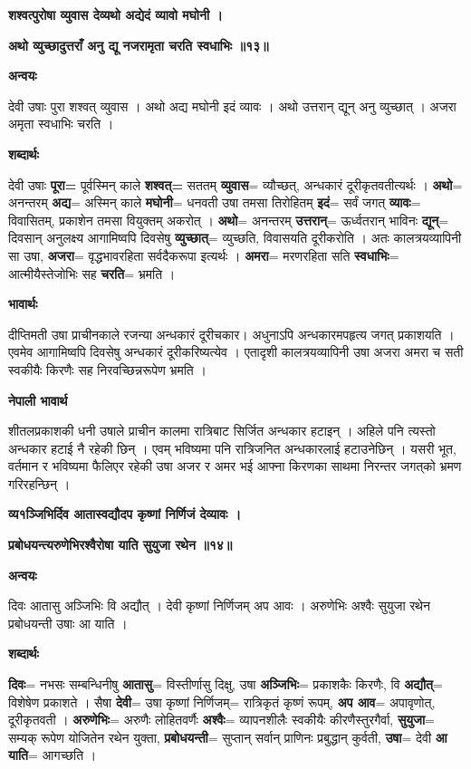 \documentclass[11pt, a5paper]{article}
\begin{document}
\textbf{शश्वत्पुरोषा व्युवास देव्यथो अद्येदं व्यावो मघोनी ।}

\textbf{अथो व्युच्छादुत्तराँ अनु द्यू नजरामृता चरति स्वधाभिः ॥१३॥}

\textbf{अन्वयः}

देवी उषाः पुरा शश्वत् व्युवास । अथो अद्य मघोनी इदं व्यावः । अथो उत्तरान् द्यून् अनु व्युच्छात् । अजरा अमृता स्वधाभिः चरति ।

\textbf{शब्दार्थः}

देवी उषाः \textbf{पूरा=} पूर्वस्मिन् काले \textbf{शश्वत्=} सततम् \textbf{व्युवास}= व्यौच्छत्, अन्धकारं दूरीकृतवतीत्यर्थः । \textbf{अथो}= अनन्तरम् \textbf{अद्य}= अस्मिन् काले \textbf{मघोनी}= धनवती उषा तमसा तिरोहितम् \textbf{इदं}= सर्वं जगत् \textbf{व्यावः}= विवासितम्, प्रकाशेन तमसा वियुक्तम् अकरोत् । \textbf{अथो}= अनन्तरम् \textbf{उत्तरान्}= ऊर्ध्वतरान् भाविनः \textbf{द्यून्}= दिवसान् अनुलक्ष्य आगामिष्वपि दिवसेषु \textbf{व्युच्छात्}= व्युच्छति, विवासयति दूरीकरोति ।  अतः कालत्रयव्यापिनी सा उषा, \textbf{अजरा}= वृद्धभावरहिता सर्वदैकरूपा इत्यर्थः । \textbf{अमरा}= मरणरहिता सति \textbf{स्वधाभिः}= आत्मीयैस्तेजोभिः सह \textbf{चरति}= भ्रमति ।

\textbf{भावार्थः}

दीप्तिमती उषा प्राचीनकाले रजन्या अन्धकारं दूरीचकार। अधुनाऽपि अन्धकारमपहृत्य जगत् प्रकाशयति । एवमेव आगामिष्वपि दिवसेषु अन्धकारं दूरीकरिष्यत्येव । एतादृशी कालत्रयव्यापिनी उषा अजरा अमरा च सती स्वकीयैः किरणैः सह निरवच्छिन्नरूपेण भ्रमति ।

\textbf{नेपाली भावार्थ}

शीतलप्रकाशकी धनी उषाले प्राचीन कालमा रात्रिबाट सिर्जित अन्धकार हटाइन् । अहिले पनि त्यस्तो अन्धकार हटाई नै रहेकी छिन् । एवम् भविष्यमा पनि रात्रिजनित अन्धकारलाई हटाउनेछिन् । यसरी भूत, वर्तमान र भविष्यमा फैलिएर रहेकी उषा अजर र अमर भई आफ्ना किरणका साथमा निरन्तर जगत्‌को भ्रमण गरिरहन्छिन् ।

\textbf{व्य१ञ्जिभिर्दिव आतास्वद्यौदप कृष्णां निर्णिजं देव्यावः ।}

\textbf{प्रबोधयन्त्यरुणेभिरश्वैरोषा याति सुयुजा रथेन ॥१४॥}

\textbf{अन्वयः}

दिवः आतासु अञ्जिभिः वि अद्यौत् । देवी कृष्णां निर्णिजम् अप आवः । अरुणेभिः अश्वैः सुयुजा रथेन प्रबोधयन्ती उषाः आ याति ।

\textbf{शब्दार्थः}

\textbf{दिवः}= नभसः सम्बन्धिनीषु \textbf{आतासु}= विस्तीर्णासु दिक्षु, उषा \textbf{अञ्जिभिः}= प्रकाशकैः किरणैः, वि \textbf{अद्यौत्}= विशेषेण प्रकाशते । सैषा \textbf{देवी}= उषा कृष्णां निर्णिजम्= रात्रिकृतं कृष्णं रूपम्, \textbf{अप आव}= अपावृणोत्, दूरीकृतवती । \textbf{अरुणेभिः}= अरुणैः लोहितवर्णैः \textbf{अश्वैः}= व्यापनशीलैः स्वकीयैः कीरणैस्तुरगैर्वा, \textbf{सुयुजा}= सम्यक् रूपेण योजितेन रथेन युक्ता, \textbf{प्रबोधयन्ती}= सुप्तान् सर्वान् प्राणिनः प्रबुद्धान् कुर्वती, \textbf{उषा}= देवी \textbf{आ याति}= आगच्छति ।
\end{document}
